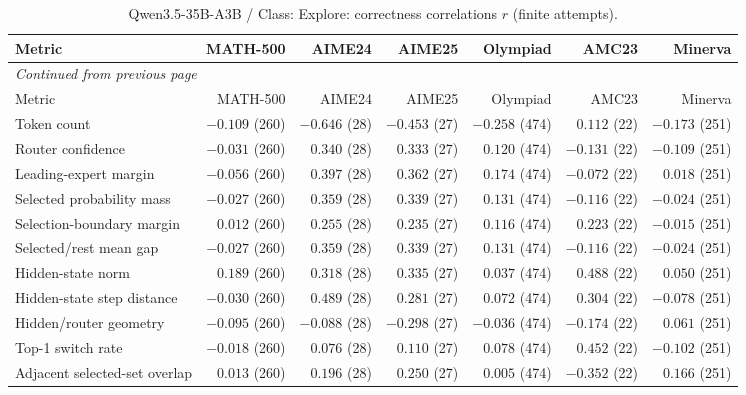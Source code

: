 \begingroup\scriptsize\setlength{\tabcolsep}{4pt}
\begin{longtable}{@{}lrrrrrr@{}}
\caption{Qwen3.5-35B-A3B / Class: Explore: correctness correlations $r$ (finite attempts).}\label{tab:multi-qwen-class-Explore}\\
\toprule
Metric & MATH-500 & AIME24 & AIME25 & Olympiad & AMC23 & Minerva \\
\midrule\endfirsthead
\multicolumn{7}{l}{\textit{Continued from previous page}}\\
\toprule
Metric & MATH-500 & AIME24 & AIME25 & Olympiad & AMC23 & Minerva \\
\midrule\endhead
\bottomrule\endfoot
Token count & $-0.109$ (260) & $-0.646$ (28) & $-0.453$ (27) & $-0.258$ (474) & $0.112$ (22) & $-0.173$ (251) \\
Router confidence & $-0.031$ (260) & $0.340$ (28) & $0.333$ (27) & $0.120$ (474) & $-0.131$ (22) & $-0.109$ (251) \\
Leading-expert margin & $-0.056$ (260) & $0.397$ (28) & $0.362$ (27) & $0.174$ (474) & $-0.072$ (22) & $0.018$ (251) \\
Selected probability mass & $-0.027$ (260) & $0.359$ (28) & $0.339$ (27) & $0.131$ (474) & $-0.116$ (22) & $-0.024$ (251) \\
Selection-boundary margin & $0.012$ (260) & $0.255$ (28) & $0.235$ (27) & $0.116$ (474) & $0.223$ (22) & $-0.015$ (251) \\
Selected/rest mean gap & $-0.027$ (260) & $0.359$ (28) & $0.339$ (27) & $0.131$ (474) & $-0.116$ (22) & $-0.024$ (251) \\
Hidden-state norm & $0.189$ (260) & $0.318$ (28) & $0.335$ (27) & $0.037$ (474) & $0.488$ (22) & $0.050$ (251) \\
Hidden-state step distance & $-0.030$ (260) & $0.489$ (28) & $0.281$ (27) & $0.072$ (474) & $0.304$ (22) & $-0.078$ (251) \\
Hidden/router geometry & $-0.095$ (260) & $-0.088$ (28) & $-0.298$ (27) & $-0.036$ (474) & $-0.174$ (22) & $0.061$ (251) \\
Top-1 switch rate & $-0.018$ (260) & $0.076$ (28) & $0.110$ (27) & $0.078$ (474) & $0.452$ (22) & $-0.102$ (251) \\
Adjacent selected-set overlap & $0.013$ (260) & $0.196$ (28) & $0.250$ (27) & $0.005$ (474) & $-0.352$ (22) & $0.166$ (251) \\
\end{longtable}\endgroup

